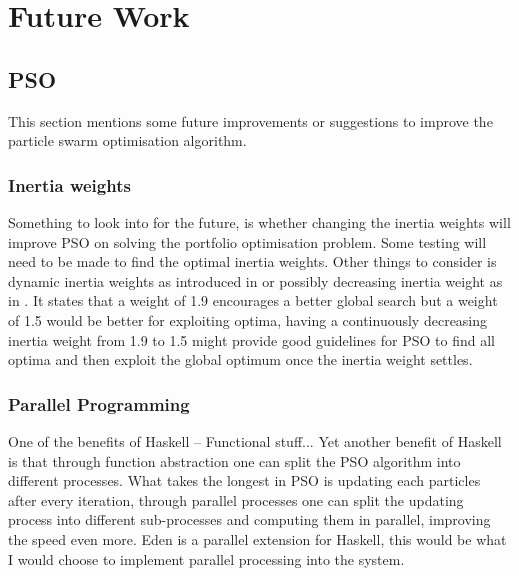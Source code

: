 \documentclass{pdfmx4020}
\begin{document}




\chapter{Future Work}

  \section{PSO} %
  \label{sec:pso}
  This section mentions some future improvements or suggestions to improve the particle swarm optimisation algorithm.
    \subsection{Inertia weights} %
    \label{sub:inertia_weights2}
      Something to look into for the future, is whether changing the inertia weights will improve PSO on solving the portfolio optimisation problem. Some testing will need to be made to find the optimal inertia weights. Other things to consider is dynamic inertia weights as introduced in \cite{dynamic_inertia} or possibly decreasing inertia weight as in \cite{inertia}. It states that a weight of 1.9 encourages a better global search but a weight of 1.5 would be better for exploiting optima, having a continuously decreasing inertia weight from 1.9 to 1.5 might provide good guidelines for PSO to find all optima and then exploit the global optimum once the inertia weight settles. 
    \subsection{Parallel Programming} %
    \label{sub:parallel_programming}
      One of the benefits of Haskell -- Functional stuff...
      Yet another benefit of Haskell is that through function abstraction \cite{haskellPSO} one can split the PSO algorithm into different processes. What takes the longest in PSO is updating each particles after every iteration, through parallel processes one can split the updating process into different sub-processes and computing them in parallel, improving the speed even more. Eden \cite{eden,eden2} is a parallel extension for Haskell, this would be what I would choose to implement parallel processing into the system.
\end{document}
